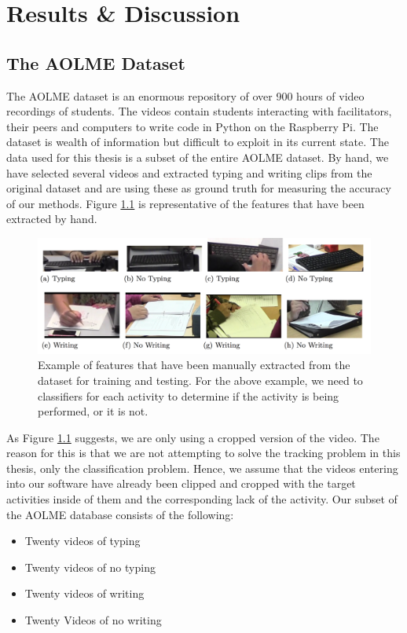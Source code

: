 \chapter{Results \& Discussion}
\section{\label{section:the_data}The AOLME Dataset}
The AOLME dataset is an enormous repository of over 900 hours of video
recordings of students. The videos contain students
interacting with facilitators, their peers and computers to write code in
Python on the Raspberry Pi.  The dataset is wealth of information but difficult
to exploit in its current state.  The data used for this thesis is a subset of
the entire AOLME dataset. By hand, we have selected several videos and extracted
typing and writing clips from the original dataset and are using these as ground
truth for measuring the accuracy of our methods. Figure \ref{fig:typing_writing}
is representative of the features that have been extracted by hand.

\begin{figure}[h]
  \label{fig:typing_writing}
  \centering
  \includegraphics[width=\textwidth]{figures/typing_writing_clip}
  \caption{Example of features that have been manually extracted from the dataset
  for training and testing. For the above example, we need to classifiers for each
  activity to determine if the activity is being performed, or it is not.}
\end{figure}

As Figure \ref{fig:typing_writing} suggests, we are only using a cropped version
of the video. The reason for this is that we are not attempting to solve the tracking
problem in this thesis, only the classification problem. Hence, we assume that
the videos entering into our software have already been clipped and cropped with
the target activities inside of them and the corresponding lack of the activity.
Our subset of the AOLME database consists of the following:

\begin{itemize}
\item Twenty videos of typing
\item Twenty videos of no typing
\item Twenty videos of writing
\item Twenty Videos of no writing
\end{itemize}

